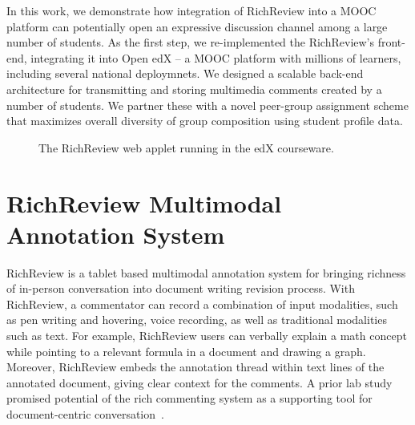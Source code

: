 \documentclass{sigchi}
\begin{document}
In this work, we demonstrate how integration of RichReview into a MOOC platform can potentially open an expressive discussion channel among a large number of students.
As the first step, we re-implemented the RichReview's front-end, integrating it into Open edX -- a MOOC platform with millions of learners, including several national deploymnets. We designed a scalable back-end architecture for transmitting and storing multimedia comments created by a number of students.
We partner these with a novel peer-group assignment scheme that maximizes overall diversity of group composition using student profile data.

\begin{figure}[!h]
\centering
{
\setlength{\fboxsep}{0pt}
\setlength{\fboxrule}{0.5pt}
}
\caption{The RichReview web applet running in the edX courseware.}
\label{fig:screenshot}
\end{figure}


\section{RichReview Multimodal Annotation System}
RichReview is a tablet based multimodal annotation system for bringing richness of in-person conversation into document writing revision process.
With RichReview, a commentator can record a combination of input modalities, such as pen writing and hovering, voice recording, as well as traditional modalities such as text.
For example, RichReview users can verbally explain a math concept while pointing to a relevant formula in a document and drawing a graph.
Moreover, RichReview embeds the annotation thread within text lines of the annotated document, giving clear context for the comments.
A prior lab study promised potential of the rich commenting system as a supporting tool for document-centric conversation~\cite{you-know-this-one-better-than-i-do}.
\end{document}

